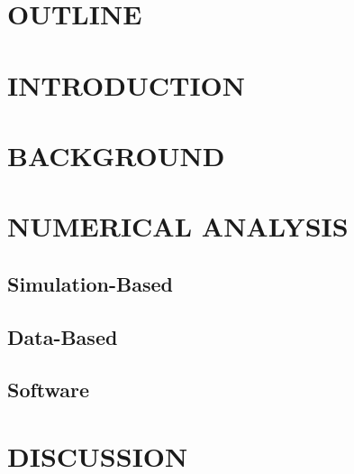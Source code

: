 
\section*{\centering OUTLINE}

\section{\centering INTRODUCTION}

\section{\centering BACKGROUND}


\section{\centering NUMERICAL ANALYSIS}

\subsection{Simulation-Based}

\subsection{Data-Based}

\subsection{Software}



\section{\centering DISCUSSION}





\clearpage






